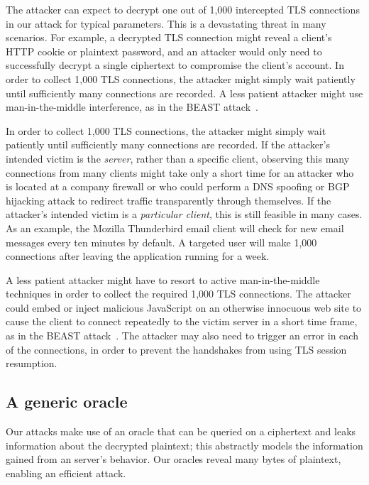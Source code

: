 The attacker can expect to decrypt one out of 1,000 intercepted TLS connections in our attack for typical parameters.  This is a devastating threat in many scenarios.  For example, a decrypted TLS connection might reveal a client's HTTP cookie or plaintext password, and an attacker would only need to successfully decrypt a single ciphertext to compromise the client's account. In order to collect 1,000 TLS connections, the attacker might simply wait patiently until sufficiently many connections are recorded.
A less patient attacker might use man-in-the-middle interference, as in the
BEAST attack~\cite{BEAST}.

\ifext
In order to collect 1,000 TLS connections, the attacker might simply wait patiently until sufficiently many connections are recorded.  If the attacker's intended victim is the \emph{server}, rather than a specific client, observing this many connections from many clients might take only a short time for an attacker who is located at a company firewall or who could perform a DNS spoofing or BGP hijacking attack to redirect traffic transparently through themselves.  If the attacker's intended victim is a \emph{particular client}, this is still feasible in many cases.  As an example, the Mozilla Thunderbird email client will check for new email messages every ten minutes by default.  A targeted user will make 1,000 connections after leaving the application running for a week.

A less patient attacker might have to resort to active man-in-the-middle techniques
in order to collect the required 1,000 TLS connections.
The attacker could embed or inject malicious JavaScript on an otherwise innocuous web site to cause the client to connect repeatedly to the victim server in a short time frame, as in the BEAST attack~\cite{BEAST}.
The attacker may also need to trigger an error in each of the connections, in order
to prevent the handshakes from using TLS session resumption.
\fi


\subsection{A generic \ssltwo oracle}

Our attacks make use of an oracle that can be queried on a ciphertext and leaks information about the decrypted plaintext; this abstractly models the information gained from an \ssltwo server's behavior.  Our \ssltwo oracles reveal many bytes of plaintext, enabling an efficient attack.


